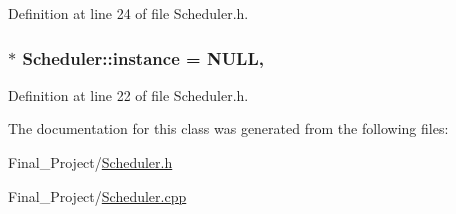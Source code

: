 Definition at line 24 of file Scheduler.\-h.

\hypertarget{classScheduler_ae683641d0a2c37275631cebb77387e2f}{
\subsubsection[{instance}]{ $\ast$ Scheduler\-::instance = N\-U\-L\-L\hspace{0.3cm}{\ttfamily [static]}, {\ttfamily [private]}}}\label{classScheduler_ae683641d0a2c37275631cebb77387e2f}


Definition at line 22 of file Scheduler.\-h.



The documentation for this class was generated from the following files\-:\begin{DoxyCompactItemize}
\item 
Final\-\_\-\-Project/\hyperlink{Scheduler_8h}{Scheduler.\-h}\item 
Final\-\_\-\-Project/\hyperlink{Scheduler_8cpp}{Scheduler.\-cpp}\end{DoxyCompactItemize}
